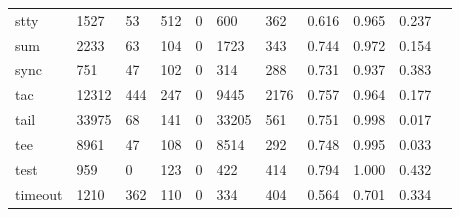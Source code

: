 \begin{longtable}{lp{1.10cm}p{1.10cm}p{1.10cm}p{1.10cm}p{1.10cm}p{1.10cm}p{1.10cm}p{1.10cm}p{1.10cm}p{1.10cm}}
stty      &                   1527 &                                 53 &                               512 &                                0 &                               600 &                             362 &                          0.616 &                                 0.965 &                               0.237 \\
sum       &                   2233 &                                 63 &                               104 &                                0 &                              1723 &                             343 &                          0.744 &                                 0.972 &                               0.154 \\
sync      &                    751 &                                 47 &                               102 &                                0 &                               314 &                             288 &                          0.731 &                                 0.937 &                               0.383 \\
tac       &                  12312 &                                444 &                               247 &                                0 &                              9445 &                            2176 &                          0.757 &                                 0.964 &                               0.177 \\
tail      &                  33975 &                                 68 &                               141 &                                0 &                             33205 &                             561 &                          0.751 &                                 0.998 &                               0.017 \\
tee       &                   8961 &                                 47 &                               108 &                                0 &                              8514 &                             292 &                          0.748 &                                 0.995 &                               0.033 \\
test      &                    959 &                                  0 &                               123 &                                0 &                               422 &                             414 &                          0.794 &                                 1.000 &                               0.432 \\
timeout   &                   1210 &                                362 &                               110 &                                0 &                               334 &                             404 &                          0.564 &                                 0.701 &                               0.334 \\

\end{longtable}
